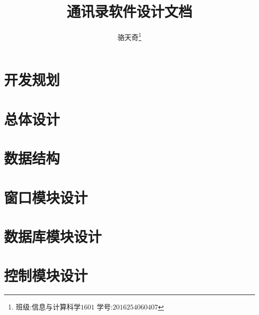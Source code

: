 \documentclass[a4paper,14pt]{report}
\title{\fontsize{24}{0.1in}通讯录软件设计文档}
\author{骆天奇\thanks{班级:信息与计算科学$1601$  学号:$2016254060407$}}
\date{}
\begin{document}
	\maketitle
	\tableofcontents
	
	
	
	\chapter{开发规划}
		
	\chapter{总体设计}
		
	\chapter{数据结构}
		
	\chapter{窗口模块设计}
		
	\chapter{数据库模块设计}
		
	\chapter{控制模块设计}
		
\end{document}
